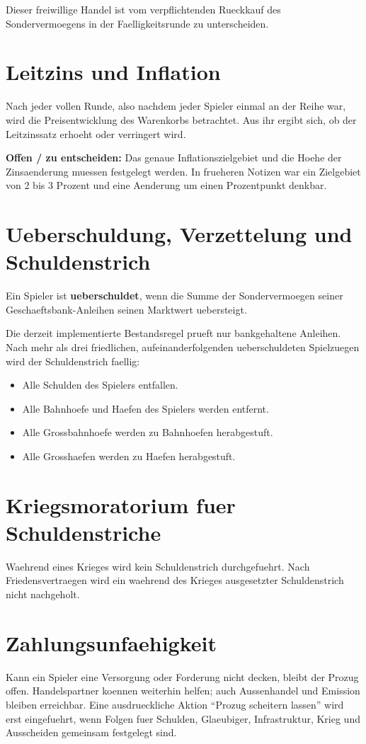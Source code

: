 \documentclass[11pt,a4paper,oneside,parskip=half]{scrreprt}
\newcommand{\begriff}[1]{\textbf{#1}}
\newcommand{\offen}[1]{\begin{framed}\noindent\textbf{Offen / zu entscheiden:} #1\end{framed}}
\begin{document}
Dieser freiwillige Handel ist vom verpflichtenden Rueckkauf des Sondervermoegens in der Faelligkeitsrunde zu unterscheiden.

\section{Leitzins und Inflation}
Nach jeder vollen Runde, also nachdem jeder Spieler einmal an der Reihe war, wird die Preisentwicklung des Warenkorbs betrachtet. Aus ihr ergibt sich, ob der Leitzinssatz erhoeht oder verringert wird.

\offen{Das genaue Inflationszielgebiet und die Hoehe der Zinsaenderung muessen festgelegt werden. In frueheren Notizen war ein Zielgebiet von 2 bis 3 Prozent und eine Aenderung um einen Prozentpunkt denkbar.}

\section{Ueberschuldung, Verzettelung und Schuldenstrich}
Ein Spieler ist \begriff{ueberschuldet}, wenn die Summe der Sondervermoegen seiner Geschaeftsbank-Anleihen seinen Marktwert uebersteigt.

Die derzeit implementierte Bestandsregel prueft nur bankgehaltene Anleihen. Nach mehr als drei friedlichen, aufeinanderfolgenden ueberschuldeten Spielzuegen wird der Schuldenstrich faellig:
\begin{itemize}
  \item Alle Schulden des Spielers entfallen.
  \item Alle Bahnhoefe und Haefen des Spielers werden entfernt.
  \item Alle Grossbahnhoefe werden zu Bahnhoefen herabgestuft.
  \item Alle Grosshaefen werden zu Haefen herabgestuft.
\end{itemize}

\section{Kriegsmoratorium fuer Schuldenstriche}
Waehrend eines Krieges wird kein Schuldenstrich durchgefuehrt. Nach Friedensvertraegen wird ein waehrend des Krieges ausgesetzter Schuldenstrich nicht nachgeholt.

\section{Zahlungsunfaehigkeit}
Kann ein Spieler eine Versorgung oder Forderung nicht decken, bleibt der Prozug offen. Handelspartner koennen weiterhin helfen; auch Aussenhandel und Emission bleiben erreichbar. Eine ausdrueckliche Aktion \enquote{Prozug scheitern lassen} wird erst eingefuehrt, wenn Folgen fuer Schulden, Glaeubiger, Infrastruktur, Krieg und Ausscheiden gemeinsam festgelegt sind.
\end{document}
